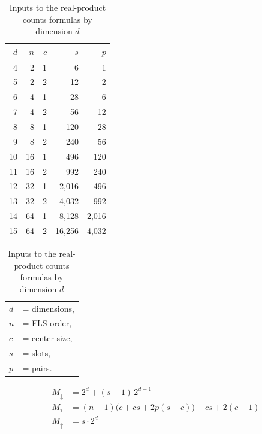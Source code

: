 \begin{table}[t]
\centering
\caption{Inputs to the real-product counts formulas by dimension \(d\)}
\label{tab:tau-inputs}

\begin{minipage}[t]{0.64\linewidth}
\centering
\begin{tabular}{rrrrr}
\toprule
$d$ & $n$ & $c$ & $s$ & $p$ \\
\midrule
4 & 2 & 1 & 6 & 1 \\
5 & 2 & 2 & 12 & 2 \\
6 & 4 & 1 & 28 & 6 \\
7 & 4 & 2 & 56 & 12 \\
\midrule
8 & 8 & 1 & 120 & 28 \\
9 & 8 & 2 & 240 & 56 \\
10 & 16 & 1 & 496 & 120 \\
11 & 16 & 2 & 992 & 240 \\
\midrule
12 & 32 & 1 & 2,016 & 496 \\
13 & 32 & 2 & 4,032 & 992 \\
14 & 64 & 1 & 8,128 & 2,016 \\
15 & 64 & 2 & 16,256 & 4,032 \\
\bottomrule
\end{tabular}
\end{minipage}\hfill
\begin{minipage}[t]{0.33\linewidth}
\small
\setlength{\tabcolsep}{2pt}
\renewcommand{\arraystretch}{1.1}
\begin{tabular}{@{}ll@{}}
$d$ &= dimensions, \\
$n$ &= FLS order, \\
$c$ &= center size, \\
$s$ &= slots, \\
$p$ &= pairs.
\end{tabular}
\end{minipage}

\end{table}

\begin{align}
M_{\downarrow} &= 2^d + (s-1)\,2^{d-1} \label{eq:step-down}\\
M_{\tau} &= (n-1)\bigl(c + cs + 2p(s-c)\bigr) + cs + 2(c-1) \label{eq:tau-sweep}\\
M_{\uparrow} &= s \cdot 2^d \label{eq:step-up}
\end{align}

